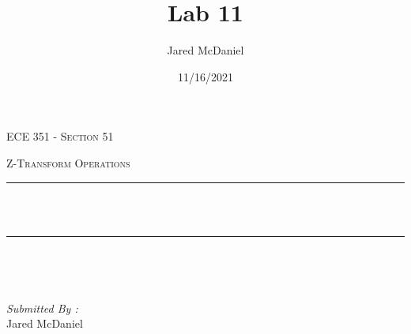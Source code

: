 \documentclass[12pt]{report}
\title{Lab 11}
\author{ Jared McDaniel}
\date{11/16/2021}
\makeatletter
\let\thetitle\@title
\makeatother
\begin{document}

\begin{titlepage}
	\centering
    \vspace*{0.5 cm}
\begin{center}    \textsc{\Large   ECE 351 - Section 51 }\\[2.0 cm]	\end{center}%
	\textsc{\Large Z-Transform Operations  }\\[0.5 cm]				%
	\rule{\linewidth}{0.2 mm} \\[0.4 cm]
	{ \huge \bfseries \thetitle}\\
	\rule{\linewidth}{0.2 mm} \\[1.5 cm]
	
	\begin{minipage}{0.4\textwidth}
		\begin{flushleft} \large
			\end{flushleft}
			\end{minipage}~
			\begin{minipage}{0.4\textwidth}
            
			\begin{flushright} \large
			\emph{Submitted By :} \\
			Jared McDaniel  
		\end{flushright}
           
	\end{minipage}\\[2 cm]
	
    
    
    
    
	
\end{titlepage}


\tableofcontents
\pagebreak

\renewcommand{\thesection}{\arabic{section}}
\end{document}
